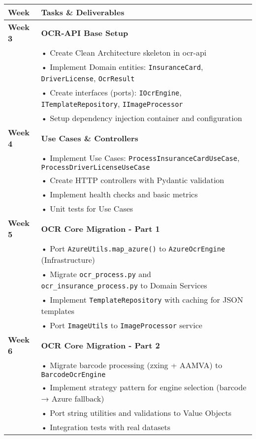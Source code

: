 \documentclass[11pt,a4paper]{article}
\begin{document}
\begin{longtable}{|p{2cm}|p{12cm}|}
\hline
\rowcolor{phase2!30}
\textbf{Week} & \textbf{Tasks \& Deliverables} \\
\hline
\endhead

\textbf{Week 3} & 
\textbf{OCR-API Base Setup} \\
& • Create Clean Architecture skeleton in ocr-api \\
& • Implement Domain entities: \texttt{InsuranceCard}, \texttt{DriverLicense}, \texttt{OcrResult} \\
& • Create interfaces (ports): \texttt{IOcrEngine}, \texttt{ITemplateRepository}, \texttt{IImageProcessor} \\
& • Setup dependency injection container and configuration \\
\hline

\textbf{Week 4} & 
\textbf{Use Cases \& Controllers} \\
& • Implement Use Cases: \texttt{ProcessInsuranceCardUseCase}, \texttt{ProcessDriverLicenseUseCase} \\
& • Create HTTP controllers with Pydantic validation \\
& • Implement health checks and basic metrics \\
& • Unit tests for Use Cases \\
\hline

\textbf{Week 5} & 
\textbf{OCR Core Migration - Part 1} \\
& • Port \texttt{AzureUtils.map\_azure()} to \texttt{AzureOcrEngine} (Infrastructure) \\
& • Migrate \texttt{ocr\_process.py} and \texttt{ocr\_insurance\_process.py} to Domain Services \\
& • Implement \texttt{TemplateRepository} with caching for JSON templates \\
& • Port \texttt{ImageUtils} to \texttt{ImageProcessor} service \\
\hline

\textbf{Week 6} & 
\textbf{OCR Core Migration - Part 2} \\
& • Migrate barcode processing (zxing + AAMVA) to \texttt{BarcodeOcrEngine} \\
& • Implement strategy pattern for engine selection (barcode → Azure fallback) \\
& • Port string utilities and validations to Value Objects \\
& • Integration tests with real datasets \\
\hline
\end{longtable}
\end{document}
